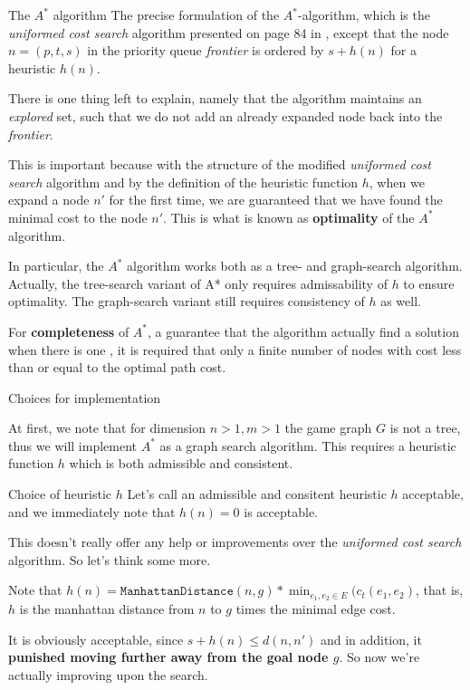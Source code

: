 \begin{subsection}{The $A^*$ algorithm}
  The precise formulation of the $A^*$-algorithm, which is the \textit{uniformed cost search} algorithm presented on page 84 in \cite{rn}, except that the node $n = (p, t, s)$ in the priority queue \textit{frontier} is ordered by $s + h(n)$ for a heuristic $h(n)$.

  There is one thing left to explain, namely that the algorithm maintains an \textit{explored} set, such that we do not add an already expanded node back into the \textit{frontier}.

  This is important because with the structure of the modified \textit{uniformed cost search} algorithm and by the definition of the heuristic function $h$, when we expand a node $n'$ for the first time, we are guaranteed that we have found the minimal cost to the node $n'$. This is what is known as \textbf{optimality} of the $A^*$ algorithm.

  In particular, the $A^*$ algorithm works both as a tree- and graph-search algorithm. Actually, the tree-search variant of A* only requires admissability of $h$ to ensure optimality. The graph-search variant still requires consistency of $h$ as well.

  For \textbf{completeness} of $A^*$, a guarantee that the algorithm actually find a solution when there is one \cite{rn}, it is required that only a finite number of nodes with cost less than or equal to the optimal path cost.

  
\end{subsection}

  \begin{subsection}{Choices for implementation}

    At first, we note that for dimension $n > 1, m > 1$ the game graph $G$ is not a tree, thus we will implement $A^*$ as a graph search algorithm. This requires a heuristic function $h$ which is both admissible and consistent.

    \begin{subsubsection}{Choice of heuristic $h$}
      Let's call an admissible and consitent heuristic $h$ acceptable, and we immediately note that $h(n) = 0$ is acceptable.

      This doesn't really offer any help or improvements over the \textit{uniformed cost search} algorithm. So let's think some more.

      Note that $h(n) = \texttt{ManhattanDistance}(n, g) * \min_{e_1, e_2\in E}(c_t(e_1, e_2)$, that is, $h$ is the manhattan distance from $n$ to $g$ times the minimal edge cost.

      It is obviously acceptable, since $s + h(n) \leq d(n, n')$ and in addition, it \textbf{punished moving further away from the goal node $g$}. So now we're actually improving upon the search. 
    \end{subsubsection}

  \end{subsection}